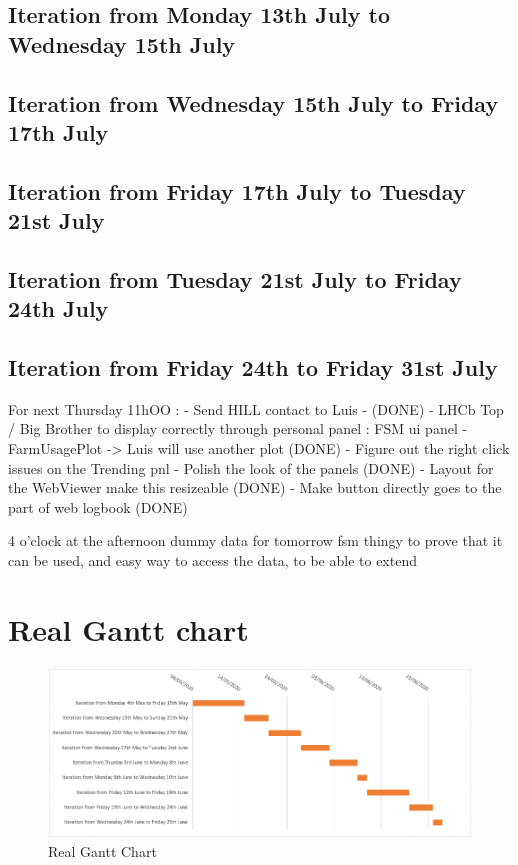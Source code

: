 \documentclass[../main.tex]{subfiles}
\begin{document}
\begin{appendix}
    \subsection{Iteration from Monday 13th July to Wednesday 15th July}
    \subsection{Iteration from Wednesday 15th July to Friday 17th July}
    \subsection{Iteration from Friday 17th July to Tuesday 21st July}
    \subsection{Iteration from Tuesday 21st July to Friday 24th July}
    \subsection{Iteration from Friday 24th to Friday 31st July}

    
    For next Thursday 11hOO : 
    - Send HILL contact to Luis - (DONE)
    - LHCb Top / Big Brother to display correctly through personal panel : FSM ui panel
    - FarmUsagePlot -> Luis will use another plot (DONE)
    - Figure out the right click issues on the Trending pnl
    - Polish the look of the panels (DONE)
    - Layout for the WebViewer make this resizeable (DONE)
    - Make button directly goes to the part of web logbook (DONE)

    4 o'clock at the afternoon
    dummy data for tomorrow
    fsm thingy
    to prove that it can be used, and easy way to access the data, to be able to extend
    \newpage
    \section{Real Gantt chart}
    \begin{figure}[h]
        \centering
        \includegraphics[scale = 0.6]{images/gantt.png}
        \caption{Real Gantt Chart}
    \end{figure}
\end{appendix}
\end{document}
